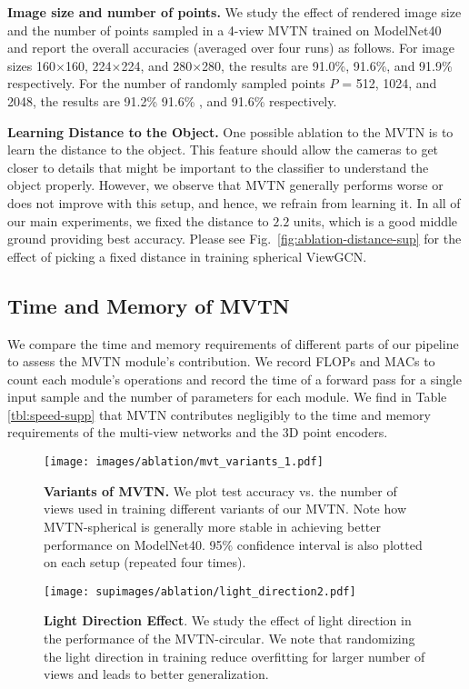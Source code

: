 \documentclass[10pt,twocolumn,letterpaper]{article}
\newcommand{\figLabel}{Fig.~}
\newcommand{\mysection}[1]{\noindent\textbf{#1.}}
\begin{document}
\mysection{Image size and number of points}
We study the effect of rendered image size and the number of points sampled in a 4-view MVTN trained on ModelNet40 and report the overall accuracies (averaged over four runs) as follows. For image sizes 160$\times$160, 224$\times$224, and 280$\times$280, the results are 91.0\%, 91.6\%, and 91.9\% respectively. For the number of randomly sampled points $P$ = 512, 1024, and 2048, the results are 91.2\% 91.6\% , and 91.6\% respectively. 


\mysection{Learning Distance to the Object}
One possible ablation to the MVTN is to learn the distance to the object. This feature should allow the cameras to get closer to details that might be important to the classifier to understand the object properly. However, we observe that MVTN generally performs worse or does not improve with this setup, and hence, we refrain from learning it. In all of our main experiments, we fixed the distance to $2.2$ units, which is a good middle ground providing best accuracy. Please see \figLabel{\ref{fig:ablation-distance-sup}} for the effect of picking a fixed distance in training spherical ViewGCN.  



\subsection{Time and Memory of MVTN}
We compare the time and memory requirements of different parts of our pipeline to assess the MVTN module's contribution. We record FLOPs and MACs to count each module's operations and record the time of a forward pass for a single input sample and the number of parameters for each module. We find in Table \ref{tbl:speed-supp} that MVTN  contributes negligibly to the time and memory requirements of the multi-view networks and the 3D point encoders. 

\begin{figure}[t]
    \centering
    \texttt{[image: images/ablation/mvt\_variants\_1.pdf]}
    \caption{\textbf{Variants of MVTN.} We plot test accuracy vs. the number of views used in training different variants of our MVTN. Note how MVTN-spherical is generally more stable in achieving better performance on ModelNet40. 95\% confidence interval is also plotted on each setup (repeated four times).}
    \label{fig:mvtn-variants}
\end{figure}
\begin{figure}[t]
    \centering
    \texttt{[image: supimages/ablation/light\_direction2.pdf]}
    \caption{\textbf{Light Direction Effect}. We study the effect of light direction in the performance of the MVTN-circular. We note that randomizing the light direction in training reduce overfitting for larger number of views and leads to better generalization.}
    \label{fig:ablation-light-sup}
\end{figure}
\end{document}
